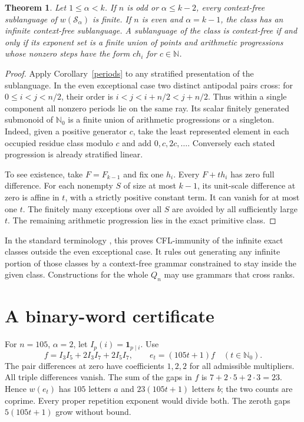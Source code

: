 \documentclass[11pt]{article}
\newtheorem{theorem}{Theorem}
\newcommand{\N}{\mathbb N_0}
\newcommand{\rankset}{\mathcal S}
\begin{document}
\begin{theorem}\label{immune}
Let \(1\le\alpha<k\). If \(n\) is odd or \(\alpha\le k-2\), every
context-free sublanguage of \(w(\rankset_\alpha)\) is finite.
If \(n\) is even and \(\alpha=k-1\), the class has an infinite
context-free sublanguage. A sublanguage of the class is context-free
if and only if its exponent set is a finite union of points and
arithmetic progressions whose nonzero steps have the form \(c h_i\)
for \(c\in\mathbb N\).
\end{theorem}
\begin{proof}
Apply Corollary~\ref{periods} to any stratified presentation of the
sublanguage. In the even exceptional case two distinct antipodal
pairs cross: for \(0\le i<j<n/2\), their order is
\(i<j<i+n/2<j+n/2\). Thus within a single component all nonzero
periods lie on the same ray. Its scalar finitely generated submonoid
of \(\N\) is a finite union of arithmetic progressions or a singleton.
Indeed, given a positive generator \(c\), take the least represented
element in each occupied residue class modulo \(c\) and add
\(0,c,2c,\ldots\). Conversely each stated progression is already
stratified linear.

To see existence, take \(F=F_{k-1}\) and fix one \(h_i\).
Every \(F+t h_i\) has zero full difference. For each nonempty \(S\)
of size at most \(k-1\), its unit-scale difference at zero is affine
in \(t\), with a strictly positive constant term. It can vanish for
at most one \(t\). The finitely many exceptions over all \(S\) are
avoided by all sufficiently large \(t\). The remaining arithmetic
progression lies in the exact primitive class.
\end{proof}

In the standard terminology \cite{immune}, this proves CFL-immunity
of the infinite exact classes outside the even exceptional case.
It rules out generating any infinite portion of those classes by
a context-free grammar constrained to stay inside the given class.
Constructions for the whole \(Q_n\) may use grammars that cross ranks.

\section{A binary-word certificate}
For \(n=105\), \(\alpha=2\), let \(I_p(i)=\mathbf1_{p\mid i}\). Use
\[
  f=I_3I_5+2I_3I_7+2I_5I_7,\qquad e_t=(105t+1)f\quad(t\in\N).
\]
The pair differences at zero have coefficients \(1,2,2\) for all
admissible multipliers. All triple differences vanish. The sum of
the gaps in \(f\) is \(7+2\cdot5+2\cdot3=23\). Hence \(w(e_t)\)
has \(105\) letters \(a\) and \(23(105t+1)\) letters \(b\); the two
counts are coprime. Every proper repetition exponent would divide
both. The zeroth gaps \(5(105t+1)\) grow without bound.
\end{document}
